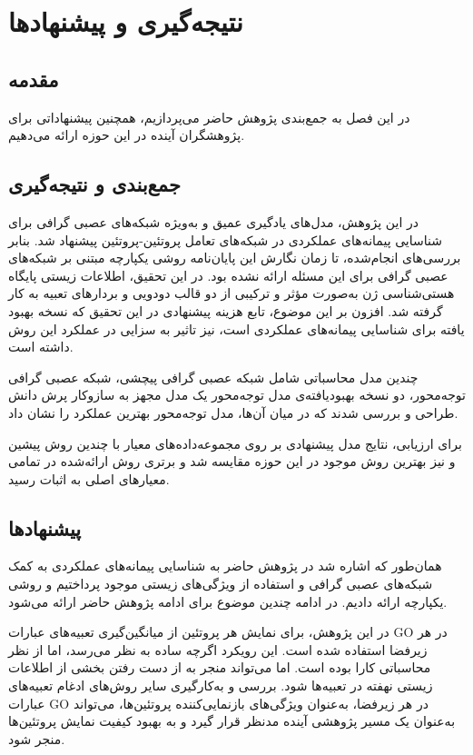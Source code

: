 \chapter{نتیجه‌گیری و پیشنهاد‌ها}

\section{مقدمه}
در این فصل به جمع‌بندی پژوهش حاضر می‌پردازیم، همچنین پیشنهاداتی برای پژوهشگران آینده در این حوزه ارائه می‌دهیم.

\section{جمع‌بندی و نتیجه‌گیری}

در این پژوهش، مدل‌های یادگیری عمیق و به‌ویژه شبکه‌های عصبی گرافی برای شناسایی پیمانه‌های عملکردی در شبکه‌های تعامل پروتئین-پروتئین پیشنهاد شد. بنابر بررسی‌های انجام‌شده، تا زمان نگارش این پایان‌نامه روشی یکپارچه مبتنی بر شبکه‌های عصبی گرافی برای این مسئله ارائه نشده بود. در این تحقیق، اطلاعات زیستی پایگاه هستی‌شناسی ژن به‌صورت مؤثر و ترکیبی از دو قالب دودویی و بردارهای تعبیه به کار گرفته شد. افزون بر این موضوع، تابع هزینه پیشنهادی در این تحقیق که نسخه بهبود یافته  برای شناسایی پیمانه‌های عملکردی است، نیز تاثیر به سزایی در عملکرد این روش داشته است.

چندین مدل محاسباتی شامل شبکه عصبی گرافی پیچشی، شبکه عصبی گرافی توجه‌محور، دو نسخه بهبودیافته‌ی مدل توجه‌محور یک مدل مجهز به سازوکار پرش دانش طراحی و بررسی شدند که در میان آن‌ها، مدل توجه‌محور بهترین عملکرد را نشان داد.

برای ارزیابی، نتایج مدل‌ پیشنهادی بر روی مجموعه‌داده‌های معیار با چندین روش پیشین و نیز بهترین روش موجود در این حوزه مقایسه شد و برتری روش ارائه‌شده در تمامی معیارهای اصلی به اثبات رسید.

\section{پیشنهاد‌ها}
همان‌طور که اشاره شد در پژوهش حاضر به شناسایی پیمانه‌های عملکردی به کمک شبکه‌های عصبی گرافی و استفاده از ویژگی‌های زیستی موجود پرداختیم و روشی یکپارچه ارائه دادیم. در ادامه چندین موضوع برای ادامه پژوهش حاضر ارائه می‌شود.

در این پژوهش، برای نمایش هر پروتئین از میانگین‌گیری تعبیه‌های عبارات  GO در هر زیر‌فضا استفاده شده است. این رویکرد اگرچه ساده به نظر می‌رسد، اما از نظر محاسباتی کارا بوده است. اما می‌تواند منجر به از دست رفتن بخشی از اطلاعات زیستی نهفته در تعبیه‌ها شود. بررسی و به‌کارگیری سایر روش‌های ادغام تعبیه‌های عبارات GO در هر زیر‌فضا، به‌عنوان ویژگی‌های بازنمایی‌کننده پروتئین‌ها، می‌تواند به‌عنوان یک مسیر پژوهشی آینده مدنظر قرار گیرد و به بهبود کیفیت نمایش پروتئین‌ها منجر شود.

